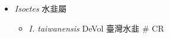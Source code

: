 
  \begin{itemize}
 \item[] \textit{Isoetes} 水韭屬
                                
  \begin{itemize}
        \item[] \textit{I. taiwanensis} DeVol  臺灣水韭  \# CR
  \end{itemize}
  \end{itemize}
